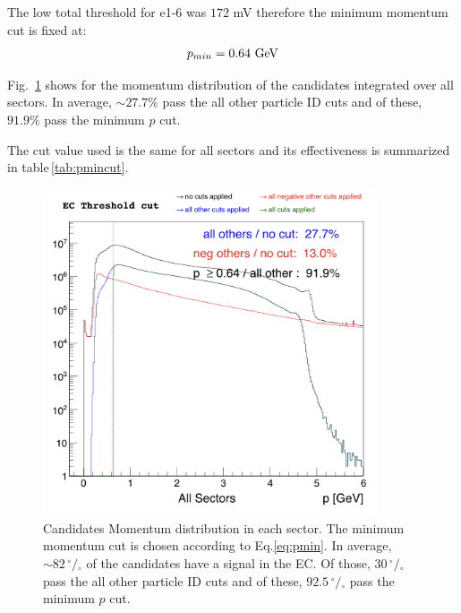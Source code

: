 The low total threshold for e1-6 was $172$ mV therefore the minimum momentum cut is fixed at:
$$
p_{min} = 0.64\,\,{\rm GeV}
$$

Fig.~\ref{fig:pmincut_alls} shows for the momentum distribution of the candidates integrated
over all sectors. In average, $\sim 27.7\%$  pass the all other particle ID
cuts and of these, $91.9\%$ pass the minimum $p$ cut.

The cut value used is the same for all sectors and its effectiveness is summarized in 
table\,\ref{tab:pmincut}.


\begin{figure}[ht]
  \centering
		\includegraphics[width=0.88\textwidth]{img/cut-04pthr_sector-all.png}
		\caption{Candidates Momentum distribution in each sector. The minimum momentum cut is
               chosen according to Eq.\ref{eq:pmin}. In average, $\sim 82 \,^{\circ\!\!}/\!_\circ$ 
					of the candidates have a signal in the EC. Of those, $30 \,^{\circ\!\!}/\!_\circ$
					pass the all other particle ID cuts and of these, $92.5 \,^{\circ\!\!}/\!_\circ$
					pass the minimum $p$ cut.}
 		\label{fig:pmincut_alls}
\end{figure}

\clearpage



